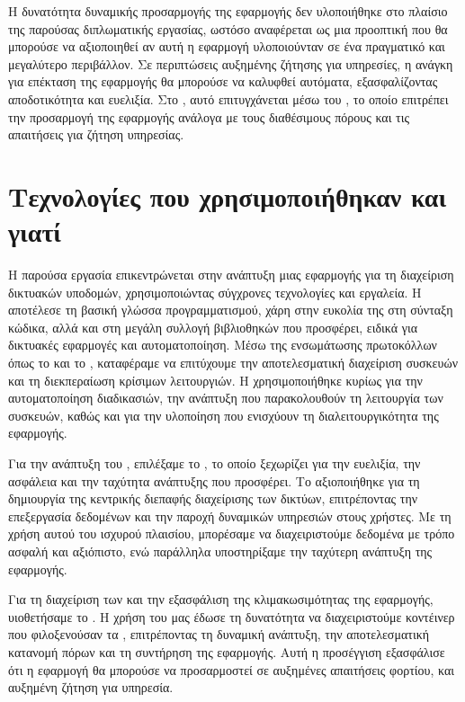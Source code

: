 Η δυνατότητα δυναμικής προσαρμογής της εφαρμογής δεν υλοποιήθηκε στο πλαίσιο της παρούσας διπλωματικής εργασίας, ωστόσο αναφέρεται ως μια προοπτική που θα μπορούσε να αξιοποιηθεί αν αυτή η εφαρμογή υλοποιούνταν σε ένα πραγματικό και μεγαλύτερο περιβάλλον. Σε περιπτώσεις αυξημένης ζήτησης για υπηρεσίες, η ανάγκη για επέκταση της εφαρμογής θα μπορούσε να καλυφθεί αυτόματα, εξασφαλίζοντας αποδοτικότητα και ευελιξία. Στο , αυτό επιτυγχάνεται μέσω του , το οποίο επιτρέπει την προσαρμογή της εφαρμογής ανάλογα με τους διαθέσιμους πόρους και τις απαιτήσεις για ζήτηση υπηρεσίας.  

\section{Τεχνολογίες που χρησιμοποιήθηκαν και γιατί}



Η παρούσα εργασία επικεντρώνεται στην ανάπτυξη μιας εφαρμογής 
για τη διαχείριση δικτυακών υποδομών, χρησιμοποιώντας σύγχρονες 
τεχνολογίες και εργαλεία. Η  αποτέλεσε τη βασική γλώσσα 
προγραμματισμού, χάρη στην ευκολία της στη σύνταξη κώδικα, αλλά και 
στη μεγάλη συλλογή βιβλιοθηκών που προσφέρει, ειδικά για δικτυακές 
εφαρμογές και αυτοματοποίηση. Μέσω της ενσωμάτωσης πρωτοκόλλων όπως 
το  και το , καταφέραμε να επιτύχουμε την 
αποτελεσματική διαχείριση συσκευών και τη διεκπεραίωση κρίσιμων 
λειτουργιών. Η  χρησιμοποιήθηκε κυρίως για την 
αυτοματοποίηση διαδικασιών, την ανάπτυξη  που 
παρακολουθούν τη λειτουργία των συσκευών, καθώς και για την 
υλοποίηση  που ενισχύουν τη διαλειτουργικότητα της εφαρμογής.

Για την ανάπτυξη του , επιλέξαμε το , 
το οποίο ξεχωρίζει για την ευελιξία, την ασφάλεια και την 
ταχύτητα ανάπτυξης που προσφέρει. Το  
αξιοποιήθηκε για τη δημιουργία της κεντρικής διεπαφής διαχείρισης 
των δικτύων, επιτρέποντας την επεξεργασία δεδομένων και 
την παροχή δυναμικών υπηρεσιών στους χρήστες. Με τη χρήση αυτού 
του ισχυρού πλαισίου, μπορέσαμε να διαχειριστούμε δεδομένα με 
τρόπο ασφαλή και αξιόπιστο, ενώ παράλληλα υποστηρίξαμε την ταχύτερη 
ανάπτυξη της εφαρμογής.

Για τη διαχείριση των  και την εξασφάλιση της 
κλιμακωσιμότητας της εφαρμογής, υιοθετήσαμε το . 
Η χρήση του  μας έδωσε τη δυνατότητα να 
διαχειριστούμε κοντέινερ που φιλοξενούσαν τα , 
επιτρέποντας τη δυναμική ανάπτυξη, την αποτελεσματική κατανομή πόρων 
και τη συντήρηση της εφαρμογής. Αυτή η προσέγγιση εξασφάλισε ότι η 
εφαρμογή θα μπορούσε να προσαρμοστεί σε αυξημένες απαιτήσεις φορτίου, 
και αυξημένη ζήτηση για υπηρεσία.

